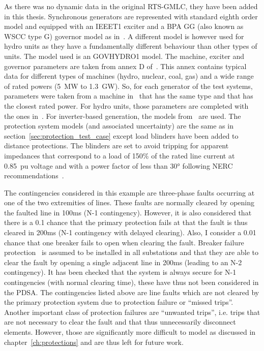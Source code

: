 As there was no dynamic data in the original RTS-GMLC, they have been added in this thesis. Synchronous generators are represented with standard eighth order model and equipped with an IEEET1 exciter and a BPA GG (also known as WSCC type G) governor model as in~\cite{IEEE39Dynamic}. A different model is however used for hydro units as they have a fundamentally different behaviour than other types of units. The model used is an GOVHYDRO1 model. The machine, exciter and governor parameters are taken from annex D of~\cite{vittalBook}. This annex contains typical data for different types of machines (hydro, nuclear, coal, gas) and a wide range of rated powers (5~MW to 1.3~GW). So, for each generator of the test systems, parameters were taken from a machine in~\cite{vittalBook} that has the same type and that has the closest rated power. For hydro units, those parameters are completed with the ones in~\cite{hydroGov}. For inverter-based generation, the models from~\cite{ChaspierreThesis} are used. The protection system models (and associated uncertainty) are the same as in section~\ref{sec:protection_test_case} except load blinders have been added to distance protections. The blinders are set to avoid tripping for apparent impedances that correspond to a load of 150\% of the rated line current at 0.85~pu voltage and with a power factor of less than 30° following NERC recommendations~\cite{NERC_load_blinders}.

The contingencies considered in this example are three-phase faults occurring at one of the two extremities of lines. These faults are normally cleared by opening the faulted line in 100ms (N-1 contingency). However, it is also considered that there is a 0.1 chance that the primary protection fails at that the fault is thus cleared in 200ms (N-1 contingency with delayed clearing). Also, I consider a 0.01 chance that one breaker fails to open when clearing the fault. Breaker failure protection~\cite{HorowitzBook} is assumed to be installed in all substations and that they are able to clear the fault by opening a single adjacent line in 200ms (leading to an N-2 contingency). It has been checked that the system is always secure for N-1 contingencies (with normal clearing time), these have thus not been considered in the PDSA. The contingencies listed above are line faults which are not cleared by the primary protection system due to protection failure or ``missed trips''. Another important class of protection failures are ``unwanted trips'', i.e. trips that are not necessary to clear the fault and that thus unnecessarily disconnect elements. However, those are significantly more difficult to model as discussed in chapter~\ref{ch:protections} and are thus left for future work.

